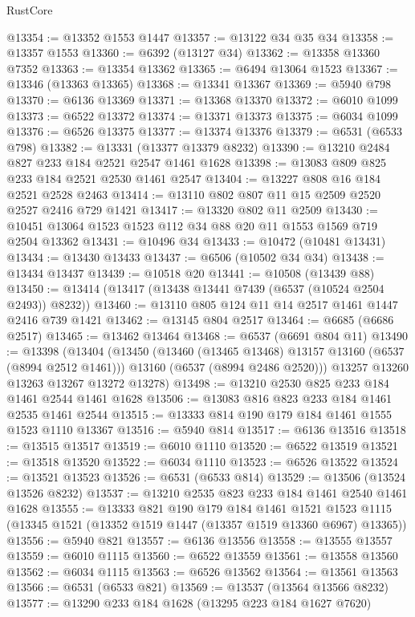 \begin{lexlean}{RustCore}
\begin{coremodule}
@13354 := @13352 @1553 @1447
@13357 := @13122 @34 @35 @34
@13358 := @13357 @1553
@13360 := @6392 (@13127 @34)
@13362 := @13358 @13360 @7352
@13363 := @13354 @13362
@13365 := @6494 @13064 @1523
@13367 := @13346 (@13363 @13365)
@13368 := @13341 @13367
@13369 := @5940 @798
@13370 := @6136 @13369
@13371 := @13368 @13370
@13372 := @6010 @1099
@13373 := @6522 @13372
@13374 := @13371 @13373
@13375 := @6034 @1099
@13376 := @6526 @13375
@13377 := @13374 @13376
@13379 := @6531 (@6533 @798)
@13382 := @13331 (@13377 @13379 @8232)
@13390 := @13210 @2484 @827 @233 @184 @2521 @2547 @1461 @1628
@13398 := @13083 @809 @825 @233 @184 @2521 @2530 @1461 @2547
@13404 := @13227 @808 @16 @184 @2521 @2528 @2463
@13414 := @13110 @802 @807 @11 @15 @2509 @2520 @2527 @2416 @729 @1421
@13417 := @13320 @802 @11 @2509
@13430 := @10451 @13064 @1523 @1523 @112 @34 @88 @20 @11 @1553 @1569 @719 @2504 @13362
@13431 := @10496 @34
@13433 := @10472 (@10481 @13431)
@13434 := @13430 @13433
@13437 := @6506 (@10502 @34 @34)
@13438 := @13434 @13437
@13439 := @10518 @20
@13441 := @10508 (@13439 @88)
@13450 := @13414 (@13417 (@13438 @13441 @7439 (@6537 (@10524 @2504 @2493)) @8232))
@13460 := @13110 @805 @124 @11 @14 @2517 @1461 @1447 @2416 @739 @1421
@13462 := @13145 @804 @2517
@13464 := @6685 (@6686 @2517)
@13465 := @13462 @13464
@13468 := @6537 (@6691 @804 @11)
@13490 := @13398
    (@13404
      (@13450
        (@13460 (@13465 @13468) @13157 @13160 (@6537 (@8994 @2512 @1461)))
        @13160
        (@6537 (@8994 @2486 @2520)))
      @13257
      @13260
      @13263
      @13267
      @13272
      @13278)
@13498 := @13210 @2530 @825 @233 @184 @1461 @2544 @1461 @1628
@13506 := @13083 @816 @823 @233 @184 @1461 @2535 @1461 @2544
@13515 := @13333 @814 @190 @179 @184 @1461 @1555 @1523 @1110 @13367
@13516 := @5940 @814
@13517 := @6136 @13516
@13518 := @13515 @13517
@13519 := @6010 @1110
@13520 := @6522 @13519
@13521 := @13518 @13520
@13522 := @6034 @1110
@13523 := @6526 @13522
@13524 := @13521 @13523
@13526 := @6531 (@6533 @814)
@13529 := @13506 (@13524 @13526 @8232)
@13537 := @13210 @2535 @823 @233 @184 @1461 @2540 @1461 @1628
@13555 := @13333
    @821
    @190
    @179
    @184
    @1461
    @1521
    @1523
    @1115
    (@13345 @1521 (@13352 @1519 @1447 (@13357 @1519 @13360 @6967) @13365))
@13556 := @5940 @821
@13557 := @6136 @13556
@13558 := @13555 @13557
@13559 := @6010 @1115
@13560 := @6522 @13559
@13561 := @13558 @13560
@13562 := @6034 @1115
@13563 := @6526 @13562
@13564 := @13561 @13563
@13566 := @6531 (@6533 @821)
@13569 := @13537 (@13564 @13566 @8232)
@13577 := @13290 @233 @184 @1628 (@13295 @223 @184 @1627 @7620)

\end{coremodule}
\end{lexlean}
